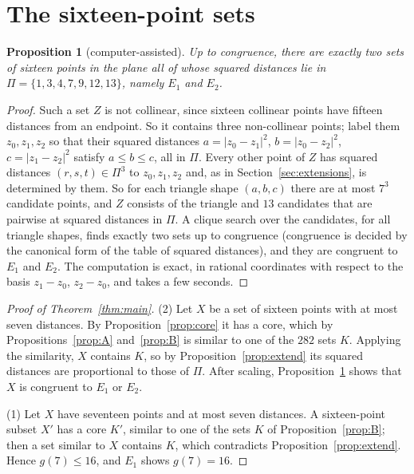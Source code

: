\documentclass[11pt]{amsart}
\newtheorem{proposition}[theorem]{Proposition}
\theoremstyle{definition}
\theoremstyle{remark}
\begin{document}
\section{The sixteen-point sets}\label{sec:end}

\begin{proposition}[computer-assisted]\label{prop:palette}
Up to congruence, there are exactly two sets of sixteen points in the plane all of whose squared distances lie
in $\Pi=\{1,3,4,7,9,12,13\}$, namely $E_1$ and $E_2$.
\end{proposition}

\begin{proof}
Such a set $Z$ is not collinear, since sixteen collinear points have fifteen distances from an endpoint. So
it contains three non-collinear points; label them $z_0,z_1,z_2$ so that their squared distances
$a=|z_0-z_1|^2$, $b=|z_0-z_2|^2$, $c=|z_1-z_2|^2$ satisfy $a\le b\le c$, all in $\Pi$. Every other point of
$Z$ has squared distances $(r,s,t)\in\Pi^3$ to $z_0,z_1,z_2$ and, as in Section~\ref{sec:extensions}, is
determined by them. So for each triangle shape $(a,b,c)$ there are at most $7^3$ candidate points, and $Z$
consists of the triangle and $13$ candidates that are pairwise at squared distances in $\Pi$. A clique
search over the candidates, for all triangle shapes, finds exactly two sets up to congruence (congruence is
decided by the canonical form of the table of squared distances), and they are congruent to $E_1$ and $E_2$.
The computation is exact, in rational coordinates with respect to the basis $z_1-z_0$, $z_2-z_0$, and takes
a few seconds.
\end{proof}

\begin{proof}[Proof of Theorem~\ref{thm:main}]
(2) Let $X$ be a set of sixteen points with at most seven distances. By Proposition~\ref{prop:core} it has a
core, which by Propositions~\ref{prop:A} and~\ref{prop:B} is similar to one of the $282$ sets $K$. Applying the
similarity, $X$ contains $K$, so by Proposition~\ref{prop:extend} its squared distances are proportional to
those of $\Pi$. After scaling, Proposition~\ref{prop:palette} shows that $X$ is congruent to $E_1$ or $E_2$.

(1) Let $X$ have seventeen points and at most seven distances. A sixteen-point subset $X'$ has a core $K'$,
similar to one of the sets $K$ of Proposition~\ref{prop:B}; then a set similar to $X$ contains $K$, which
contradicts Proposition~\ref{prop:extend}. Hence $g(7)\le16$, and $E_1$ shows $g(7)=16$.
\end{proof}
\end{document}
